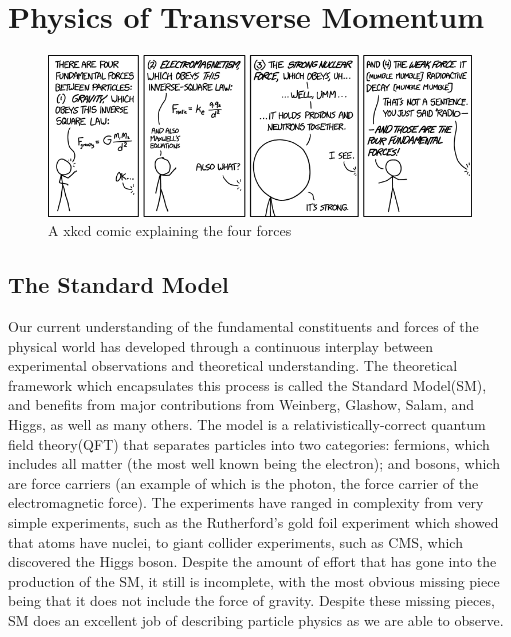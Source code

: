 \chapter{Physics of \texorpdfstring{\Z}{Z} Transverse Momentum}
\label{chapter:theory}
\begin{figure}[!htbp]
    \centering
    \includegraphics[width=\textwidth]{figures/TheoryFigures/fundamental_forcesXKCD.png}
    \caption[Short description of the four forces]{A xkcd comic explaining the four forces\cite{xkcdComic}}
    \label{fig:XKCDComic}
\end{figure}
\section{The Standard Model}

Our current understanding of the fundamental constituents and forces of the physical world has developed through a continuous interplay between experimental observations and theoretical understanding. The theoretical framework which encapsulates this process is called the Standard Model(SM), and benefits from major contributions from Weinberg, Glashow, Salam, and Higgs, as well as many others\cite{glashow1961,weinberg1967,salam1968,higgs1964}. The model is a relativistically-correct quantum field theory(QFT) that separates particles into two categories: fermions, which includes all matter (the most well known being the electron); and bosons, which are force carriers (an example of which is the photon, the force carrier of the electromagnetic force). The experiments have ranged in complexity from very simple experiments, such as the Rutherford's gold foil experiment\cite{rutherford1911} which showed that atoms have nuclei, to giant collider experiments, such as CMS, which discovered the Higgs boson. Despite the amount of effort that has gone into the production of the SM, it still is incomplete, with the most obvious missing piece being that it does not include the force of gravity. Despite these missing pieces, SM does an excellent job of describing particle physics as we are able to observe.


